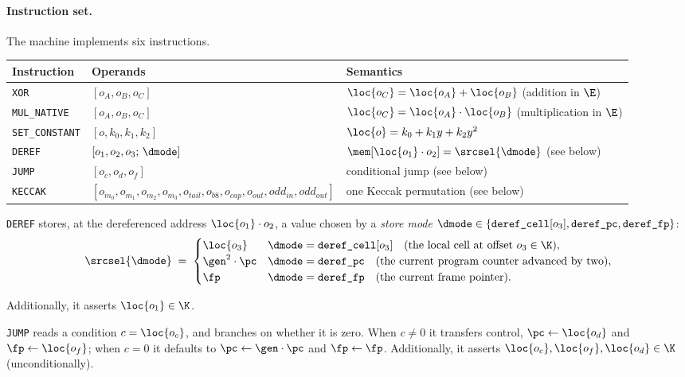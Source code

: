\paragraph{Instruction set.} The machine implements six instructions.
\begin{center}
\begin{tabularx}{\textwidth}{@{}llX@{}}
\hline
Instruction & Operands & Semantics\\
\hline
\texttt{XOR}           & $[o_A,o_B,o_C]$ & $\loc{o_C}=\loc{o_A}+\loc{o_B}$ \quad(addition in $\E$)\\
\texttt{MUL\_NATIVE}   & $[o_A,o_B,o_C]$ & $\loc{o_C}=\loc{o_A}\cdot\loc{o_B}$ (multiplication in $\E$)\\
\texttt{SET\_CONSTANT} & $[o,k_0,k_1,k_2]$ & $\loc{o}=k_0+k_1y+k_2y^{2}$\\
\texttt{DEREF}         & $[o_1,o_2,o_3;\,\dmode]$ & $\mem[\loc{o_1}\cdot o_2]=\srcsel{\dmode}$ (see below)\\
\texttt{JUMP}          & $[o_c,o_d,o_f]$ & conditional jump (see below)\\
\texttt{KECCAK}           & $[o_{m_0},o_{m_1},o_{m_2},o_{m_3},o_{\mathit{tail}},o_{\mathit{b8}},o_{\mathit{cap}},o_{\mathit{out}},\mathit{odd}_{\mathit{in}},\mathit{odd}_{\mathit{out}}]$ & one Keccak permutation (see below)\\
\hline
\end{tabularx}
\end{center}


\texttt{DEREF} stores, at the dereferenced address $\loc{o_1}\cdot o_2$, a value chosen by a \emph{store mode} $\dmode\in\{\texttt{deref\_cell}[o_3],\texttt{deref\_pc},\texttt{deref\_fp}\}$:
\[
  \srcsel{\dmode}\;=\;
  \begin{cases}
    \loc{o_3} & \dmode=\texttt{deref\_cell}[o_3] \quad(\text{the local cell at offset }o_3 \in \K),\\
    \gen^{2}\cdot\pc & \dmode=\texttt{deref\_pc} \quad(\text{the current program counter advanced by two}),\\
    \fp & \dmode=\texttt{deref\_fp} \quad(\text{the current frame pointer}).
  \end{cases}
\]

Additionally, it asserts $\loc{o_1} \in \K$.

\vspace{5mm}


\texttt{JUMP} reads a condition $c=\loc{o_c}$, and branches on whether it is zero. When $c\neq0$ it transfers control, $\pc\gets\loc{o_d}$ and $\fp\gets\loc{o_f}$; when $c=0$ it defaults to $\pc\gets\gen\cdot\pc$ and $\fp\gets\fp$. Additionally, it asserts $\loc{o_c},\loc{o_f}, \loc{o_d} \in \K$ (unconditionally).

